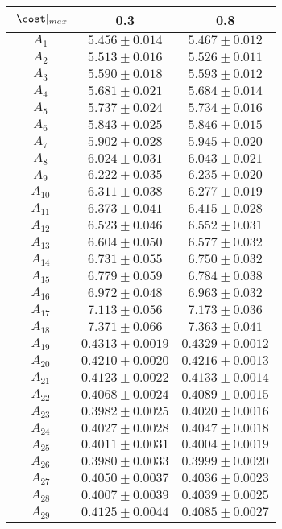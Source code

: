 \begin{tabular}{c|c|c}
$|\cost|_{max}$ & 0.3 & 0.8\\
\hline
$A_1$ & $5.456\pm0.014$ & $5.467\pm0.012$ \\
$A_2$ & $5.513\pm0.016$ & $5.526\pm0.011$ \\
$A_3$ & $5.590\pm0.018$ & $5.593\pm0.012$ \\
$A_4$ & $5.681\pm0.021$ & $5.684\pm0.014$ \\
$A_5$ & $5.737\pm0.024$ & $5.734\pm0.016$ \\
$A_6$ & $5.843\pm0.025$ & $5.846\pm0.015$ \\
$A_7$ & $5.902\pm0.028$ & $5.945\pm0.020$ \\
$A_8$ & $6.024\pm0.031$ & $6.043\pm0.021$ \\
$A_9$ & $6.222\pm0.035$ & $6.235\pm0.020$ \\
$A_10$ & $6.311\pm0.038$ & $6.277\pm0.019$ \\
$A_11$ & $6.373\pm0.041$ & $6.415\pm0.028$ \\
$A_12$ & $6.523\pm0.046$ & $6.552\pm0.031$ \\
$A_13$ & $6.604\pm0.050$ & $6.577\pm0.032$ \\
$A_14$ & $6.731\pm0.055$ & $6.750\pm0.032$ \\
$A_15$ & $6.779\pm0.059$ & $6.784\pm0.038$ \\
$A_16$ & $6.972\pm0.048$ & $6.963\pm0.032$ \\
$A_17$ & $7.113\pm0.056$ & $7.173\pm0.036$ \\
$A_18$ & $7.371\pm0.066$ & $7.363\pm0.041$ \\
$A_19$ & $0.4313\pm0.0019$ & $0.4329\pm0.0012$ \\
$A_20$ & $0.4210\pm0.0020$ & $0.4216\pm0.0013$ \\
$A_21$ & $0.4123\pm0.0022$ & $0.4133\pm0.0014$ \\
$A_22$ & $0.4068\pm0.0024$ & $0.4089\pm0.0015$ \\
$A_23$ & $0.3982\pm0.0025$ & $0.4020\pm0.0016$ \\
$A_24$ & $0.4027\pm0.0028$ & $0.4047\pm0.0018$ \\
$A_25$ & $0.4011\pm0.0031$ & $0.4004\pm0.0019$ \\
$A_26$ & $0.3980\pm0.0033$ & $0.3999\pm0.0020$ \\
$A_27$ & $0.4050\pm0.0037$ & $0.4036\pm0.0023$ \\
$A_28$ & $0.4007\pm0.0039$ & $0.4039\pm0.0025$ \\
$A_29$ & $0.4125\pm0.0044$ & $0.4085\pm0.0027$ \\

\end{tabular}
